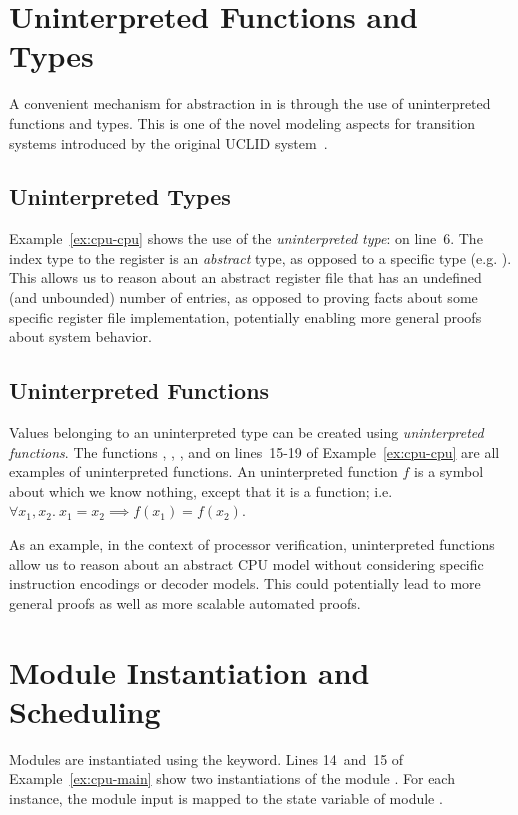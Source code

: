 \section{Uninterpreted Functions and Types}
A convenient mechanism for abstraction in \uclid{} is through the use of uninterpreted functions and types. This is one of the novel modeling
aspects for transition systems introduced by the original UCLID system~\cite{bryant-cav02}.

\subsection{Uninterpreted Types}
Example~\ref{ex:cpu-cpu} shows the use of the \emph{uninterpreted type}:  on line~6. The index type to the register is an \emph{abstract} type, as opposed to a specific type (e.g. ). This allows us to reason about an abstract register file that has an undefined (and unbounded) number of entries, as opposed to proving facts about some specific register file implementation, potentially enabling more general proofs about system behavior.

\subsection{Uninterpreted Functions}
Values belonging to an uninterpreted type can be created using \emph{uninterpreted functions}. The functions , , ,  and  on lines~15-19 of Example~\ref{ex:cpu-cpu} are all examples of uninterpreted functions. An uninterpreted function $f$ is a symbol about which we know nothing, except that it is a function; i.e. $\forall x_1, x_2.~ x_1 = x_2 \implies f(x_1) = f(x_2)$.

As an example, in the context of processor verification,
uninterpreted functions allow us to reason about an abstract CPU model without considering specific instruction encodings or decoder models. This could potentially lead to more general proofs as well as more scalable automated proofs. 


\section{Module Instantiation and Scheduling}

Modules are instantiated using the  keyword. Lines 14~and~15 of Example~\ref{ex:cpu-main} show two instantiations of the module . For each instance, the module input  is mapped to the state variable  of module .

